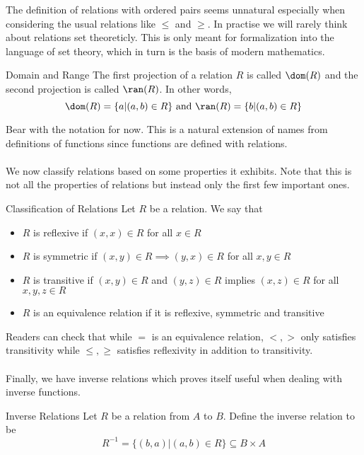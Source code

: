 The definition of relations with ordered pairs seems unnatural especially when considering the usual relations like $\leq$ and $\geq$. In practise we will rarely think about relations set theoreticly. This is only meant for formalization into the language of set theory, which in turn is the basis of modern mathematics. 

\begin{defn}{Domain and Range}{} The first projection of a relation $R$ is called $\dom(R)$ and the second projection is called $\ran(R)$. In other words, $$\dom(R)=\{a|(a,b)\in R\}\text{  and  }\ran(R)=\{b|(a,b)\in R\}$$
\end{defn}

Bear with the notation for now. This is a natural extension of names from definitions of functions since functions are defined with relations. \\~\\

We now classify relations based on some properties it exhibits. Note that this is not all the properties of relations but instead only the first few important ones. 

\begin{defn}{Classification of Relations}{} Let $R$ be a relation. We say that 
\begin{itemize}
\item $R$ is reflexive if $(x,x)\in R$ for all $x\in R$
\item $R$ is symmetric if $(x,y)\in R\implies (y,x)\in R$ for all $x,y\in R$
\item $R$ is transitive if $(x,y)\in R$ and $(y,z)\in R$ implies $(x,z)\in R$ for all $x,y,z\in R$
\item $R$ is an equivalence relation if it is reflexive, symmetric and transitive
\end{itemize}
\end{defn}

Readers can check that while $=$ is an equivalence relation, $<,>$ only satisfies transitivity while $\leq,\geq$ satisfies reflexivity in addition to transitivity. \\~\\

Finally, we have inverse relations which proves itself useful when dealing with inverse functions. 

\begin{defn}{Inverse Relations}{} Let $R$ be a relation from $A$ to $B$. Define the inverse relation to be $$R^{-1}=\{(b,a)|(a,b)\in R\}\subseteq B\times A$$
\end{defn}

